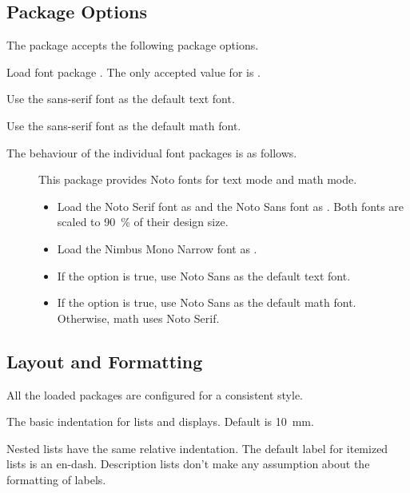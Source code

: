 \documentclass{scrartcl}
\begin{document}
\subsection{Package Options}

The  package accepts the following package options.
\begin{description}
Load font package .  The only accepted value for
 is .

Use the sans-serif font as the default text font.

Use the sans-serif font as the default math font.
\end{description}

The behaviour of the individual font packages is as follows.
\begin{description}
\item[\href{https://mirrors.ctan.org/fonts/notomath/doc/notomath-doc.pdf}{}]
This package provides Noto fonts for text mode and math mode.
\begin{itemize}
\item
Load the Noto Serif font as \symb{\rmdefault} and the Noto Sans font
as \symb{\sfdefault}.  Both fonts are scaled to \qty{90}{\%} of their
design size.
\item
Load the Nimbus Mono Narrow font as \symb{\ttdefault}.
\item
If the  option is true, use Noto Sans as the default
text font.
\item
If the  option is true, use Noto Sans as the default math
font.  Otherwise, math uses Noto Serif.
\end{itemize}
\end{description}


\subsection{Layout and Formatting}

All the loaded packages are configured for a consistent style.

\begin{definition}
The basic indentation for lists and displays.
Default is \qty{10}{mm}.
\end{definition}

Nested lists have the same relative indentation.  The default label
for itemized lists is an en-dash.  Description lists don't make any
assumption about the formatting of labels.
\end{document}
